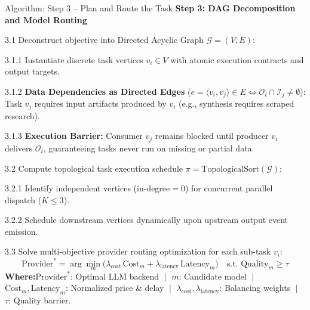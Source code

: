 \documentclass[aspectratio=169,10pt]{beamer}
\newenvironment{algolist}{%
  \begin{list}{}{%
    \setlength{\labelwidth}{1.9em}%
    \setlength{\leftmargin}{2.1em}%
    \setlength{\itemindent}{0pt}%
    \setlength{\labelsep}{0.45em}%
    \setlength{\itemsep}{0.28em}%
    \setlength{\parsep}{0pt}%
    \setlength{\topsep}{0.1em}%
    \renewcommand{\makelabel}[1]{\textbf{\color{lavenderDark}##1}}%
  }\small%
}{\end{list}}
\newenvironment{algosublist}{%
  \begin{list}{}{%
    \setlength{\labelwidth}{2.4em}%
    \setlength{\leftmargin}{2.8em}%
    \setlength{\itemindent}{0pt}%
    \setlength{\labelsep}{0.4em}%
    \setlength{\itemsep}{0.14em}%
    \setlength{\parsep}{0pt}%
    \setlength{\topsep}{0.1em}%
    \renewcommand{\makelabel}[1]{\textbf{\color{lavenderMedium}##1}}%
  }\small%
}{\end{list}}
\begin{document}
\begin{frame}[t]{Algorithm: Step 3 -- Plan and Route the Task}
\vspace{-0.15em}
{\large\bfseries\color{lavenderDark}Step 3: DAG Decomposition and Model Routing}
\vspace{0.15em}

\begin{algolist}
  \item[3.1] Deconstruct objective into Directed Acyclic Graph $\mathcal{G} = (V, E)$:
    \begin{algosublist}
      \item[3.1.1] Instantiate discrete task vertices $v_i \in V$ with atomic execution contracts and output targets.
      \item[3.1.2] \textbf{Data Dependencies as Directed Edges} ($e = \langle v_i, v_j \rangle \in E \iff \mathcal{O}_i \cap \mathcal{I}_j \neq \emptyset$): Task $v_j$ requires input artifacts produced by $v_i$ (e.g., synthesis requires scraped research).
      \item[3.1.3] \textbf{Execution Barrier:} Consumer $v_j$ remains blocked until producer $v_i$ delivers $\mathcal{O}_i$, guaranteeing tasks never run on missing or partial data.
    \end{algosublist}
  \item[3.2] Compute topological task execution schedule $\pi = \mathrm{TopologicalSort}(\mathcal{G})$:
    \begin{algosublist}
      \item[3.2.1] Identify independent vertices ($\text{in-degree} = 0$) for concurrent parallel dispatch ($K \le 3$).
      \item[3.2.2] Schedule downstream vertices dynamically upon upstream output event emission.
    \end{algosublist}
  \item[3.3] Solve multi-objective provider routing optimization for each sub-task $v_i$:
    \vspace{-0.2em}
    $$\text{Provider}^* = \arg\min_m \Big(\lambda_{\text{cost}} \, \text{Cost}_m + \lambda_{\text{latency}} \, \text{Latency}_m\Big) \quad \text{s.t. } \text{Quality}_m \ge \tau$$
    \vspace{-0.2em}
    {\footnotesize\color{prismDark}%
      \textbf{\color{lavenderDark}Where:}\enspace $\text{Provider}^*$: Optimal LLM backend $\;\vert\;$ $m$: Candidate model $\;\vert\;$ $\text{Cost}_m, \text{Latency}_m$: Normalized price \& delay $\;\vert\;$ $\lambda_{\text{cost}}, \lambda_{\text{latency}}$: Balancing weights $\;\vert\;$ $\tau$: Quality barrier.}

\end{algolist}
\end{frame}
\end{document}
